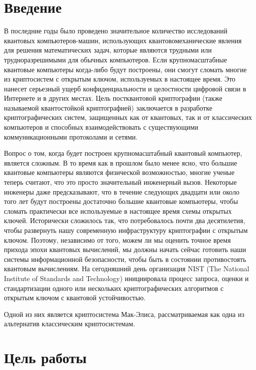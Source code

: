 \documentclass[12pt]{article}
\renewcommand\contentsname{Содержание}
\begin{document}
\setcounter{page}{2}
\renewcommand{\contentsname}{Содержание}
\tableofcontents

\newpage


\section{Введение}
В последние годы было проведено значительное количество исследований квантовых \sloppy компьютеров-машин, использующих квантовомеханические явления для решения математических задач, которые являются трудными или трудноразрешимыми для обычных компьютеров. Если крупномасштабные квантовые компьютеры когда-либо будут построены, они смогут сломать многие из криптосистем с открытым ключом, используемых в настоящее время. Это нанесет серьезный ущерб конфиденциальности и целостности цифровой связи в Интернете и в других местах.  Цель постквантовой криптографии (также называемой квантостойкой криптографией) заключается в разработке криптографических систем, защищенных как от квантовых, так и от классических компьютеров и способных взаимодействовать с существующими коммуникационными протоколами и сетями. 

Вопрос о том, когда будет построен крупномасштабный квантовый компьютер, является сложным. В то время как в прошлом было менее ясно, что большие квантовые компьютеры являются физической возможностью, многие ученые теперь считают, что это просто значительный инженерный вызов. Некоторые инженеры даже предсказывают, что в течение следующих двадцати или около того лет будут построены достаточно большие квантовые компьютеры, чтобы сломать практически все используемые в настоящее время схемы открытых ключей. Исторически сложилось так, что потребовалось почти два десятилетия, чтобы развернуть нашу современную инфраструктуру криптографии с открытым ключом.  Поэтому, независимо от того, можем ли мы оценить точное время прихода эпохи квантовых вычислений, мы должны начать сейчас готовить наши системы информационной безопасности, чтобы быть в состоянии противостоять квантовым вычислениям.
На сегодняшний день организация NIST (The National Institute of Standards and Technology)
инициировала процесс запроса, оценки и стандартизации одного или нескольких криптографических алгоритмов с открытым ключом с квантовой устойчивостью.

Одной из них является криптосистема Мак-Элиса, рассматриваемая как одна из альтернатив классическим криптосистемам.

\newpage
\section{Цель работы}
\end{document}
